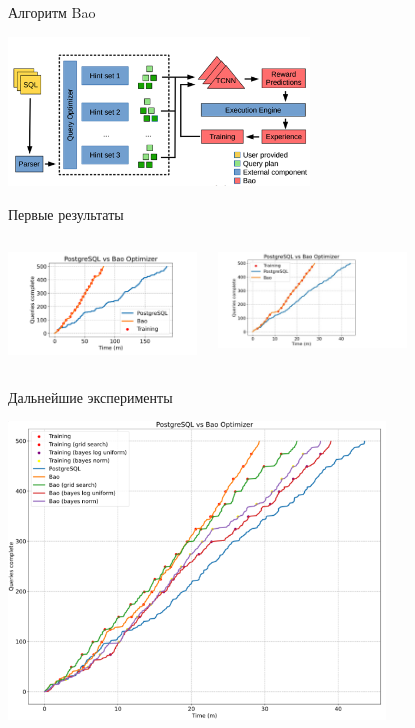 \documentclass{beamer}
\begin{document}
\begin{frame}{Алгоритм Bao}
\begin{center}
\includegraphics[width=8cm]{bao.png}
\end{center}
\end{frame}
\begin{frame}{Первые результаты}

\begin{columns}[T]
\begin{center}
\includegraphics[width=5cm]{article-results.png}
\end{center}
\begin{center}
\includegraphics[width=5cm]{real-results.png}
\end{center}
\end{columns}

\end{frame}
\begin{frame}{Дальнейшие эксперименты}
\begin{center}
\includegraphics[width=10cm]{diff-algos.png}
\end{center}
\end{frame}
\end{document}
